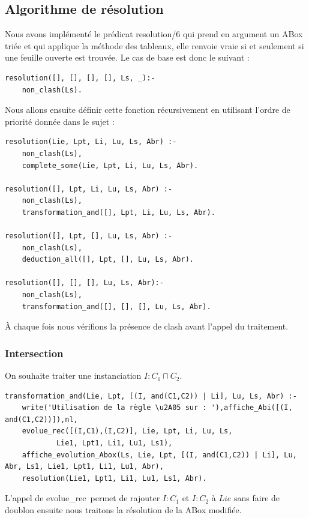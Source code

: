 \documentclass{article}
\begin{document}
\subsection{Algorithme de résolution}
Nous avons implémenté le prédicat \color{blue} resolution/6 \color{black}  qui prend en argument un ABox triée et qui applique la méthode des tableaux, elle renvoie vraie si et seulement si une feuille ouverte est trouvée. Le cas de base est donc le suivant :
\begin{verbatim}
resolution([], [], [], [], Ls, _):-
	non_clash(Ls).
\end{verbatim}

Nous allons ensuite définir cette fonction récursivement en utilisant l'ordre de priorité donnée dans le sujet :
\begin{verbatim}
resolution(Lie, Lpt, Li, Lu, Ls, Abr) :-
    non_clash(Ls),
    complete_some(Lie, Lpt, Li, Lu, Ls, Abr).
	
resolution([], Lpt, Li, Lu, Ls, Abr) :-
    non_clash(Ls),
    transformation_and([], Lpt, Li, Lu, Ls, Abr).
	
resolution([], Lpt, [], Lu, Ls, Abr) :-
    non_clash(Ls),
    deduction_all([], Lpt, [], Lu, Ls, Abr).
	
resolution([], [], [], Lu, Ls, Abr):-
	non_clash(Ls),
	transformation_and([], [], [], Lu, Ls, Abr).
\end{verbatim}

À chaque fois nous vérifions la présence de clash avant l'appel du traitement.

\subsubsection{Intersection}
On souhaite traiter une instanciation $I:C_1\sqcap C_2$.
\begin{verbatim}
transformation_and(Lie, Lpt, [(I, and(C1,C2)) | Li], Lu, Ls, Abr) :- 
	write('Utilisation de la règle \u2A05 sur : '),affiche_Abi([(I, and(C1,C2))]),nl,
	evolue_rec([(I,C1),(I,C2)], Lie, Lpt, Li, Lu, Ls,
            Lie1, Lpt1, Li1, Lu1, Ls1),
	affiche_evolution_Abox(Ls, Lie, Lpt, [(I, and(C1,C2)) | Li], Lu, Abr, Ls1, Lie1, Lpt1, Li1, Lu1, Abr),
	resolution(Lie1, Lpt1, Li1, Lu1, Ls1, Abr).
\end{verbatim}

L'appel de \color{blue}evolue\_rec\color{black}\ permet de rajouter $I:C_1$ et $I:C_2$ à $Lie$ sans faire de doublon ensuite nous traitons la résolution de la ABox modifiée.
\end{document}
